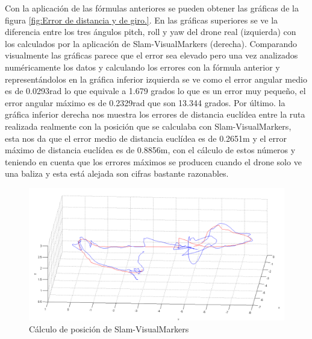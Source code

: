 \hspace{1cm} Con la aplicación de las fórmulas anteriores se pueden obtener las gráficas de la figura \ref{fig:Error de distancia y de giro.}. En las gráficas superiores se ve la diferencia entre los tres ángulos pitch, roll y yaw del drone real (izquierda) con los calculados por la aplicación de Slam-VisualMarkers (derecha). Comparando visualmente las gráficas parece que el error sea elevado pero una vez analizados numéricamente los datos y calculando los errores con la fórmula anterior y representándolos en la gráfica inferior izquierda se ve como el error angular medio es de 0.0293rad lo que equivale a 1.679 grados lo que es un error muy pequeño, el error angular máximo es de 0.2329rad que son 13.344 grados. Por último. la gráfica inferior derecha nos muestra los errores de distancia euclídea entre la ruta realizada realmente con la posición que se calculaba con Slam-VisualMarkers, esta nos da que el error medio de distancia euclídea es de 0.2651m y el error máximo de distancia euclídea es de 0.8856m, con el cálculo de estos números y teniendo en cuenta que los errores máximos se producen cuando el drone solo ve una baliza y esta está alejada son cifras bastante razonables.

\begin{figure}[H]
	\begin{center}
		\includegraphics[width=1\textwidth]{imag/IMG37.png}
				\caption{Cálculo de posición de Slam-VisualMarkers}
		\label{fig:Comparativa Slam-Visualmarkers.}	
	\end{center}
\end{figure}

